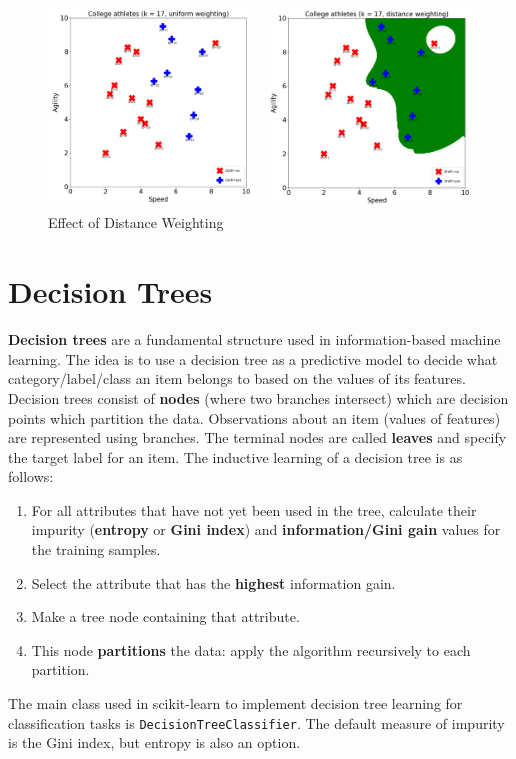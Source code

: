 \documentclass[a4paper,11pt]{article}
\begin{document}
\begin{figure}[H]
    \centering
    \includegraphics[width=\textwidth]{images/distanceweightingknn.png}
    \caption{Effect of Distance Weighting}
\end{figure}

\section{Decision Trees}
\textbf{Decision trees} are a fundamental structure used in information-based machine learning.
The idea is to use a decision tree as a predictive model to decide what category/label/class an item belongs to based on the values of its features.
Decision trees consist of \textbf{nodes} (where two branches intersect) which are decision points which partition the data.
Observations about an item (values of features) are represented using branches.
The terminal nodes are called \textbf{leaves} and specify the target label for an item.
The inductive learning of a decision tree is as follows:
\begin{enumerate}
    \item   For all attributes that have not yet been used in the tree, calculate their impurity (\textbf{entropy} or \textbf{Gini index}) and \textbf{information/Gini gain} values for the training samples.
    \item   Select the attribute that has the \textbf{highest} information gain.
    \item   Make a tree node containing that attribute.
    \item   This node \textbf{partitions} the data: apply the algorithm recursively to each partition.
\end{enumerate}

The main class used in scikit-learn to implement decision tree learning for classification tasks is \texttt{DecisionTreeClassifier}.
The default measure of impurity is the Gini index, but entropy is also an option.
\end{document}
